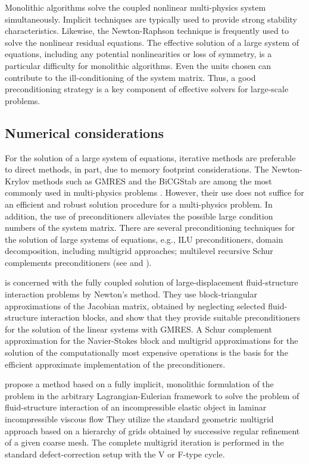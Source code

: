 Monolithic algorithms solve the coupled nonlinear multi-physics system simultaneously.
Implicit techniques are typically used to provide strong stability characteristics.
Likewise, the Newton-Raphson technique is frequently used to solve the nonlinear residual equations.
The effective solution of a large system of equations, including any potential nonlinearities or loss of symmetry, is a particular difficulty for monolithic algorithms.
Even the units chosen can contribute to the ill-conditioning of the system matrix.
Thus, a good preconditioning strategy is a key component of effective solvers for large-scale problems.

\subsection{Numerical considerations}

For the solution of a large system of equations, iterative methods are preferable to direct methods, in part, due to memory footprint considerations.
The Newton-Krylov methods such as GMRES and the BiCGStab are among the most commonly used in multi-physics problems \citep{hron_monolithic_2006}.
However, their use does not suffice for an efficient and robust solution procedure for a multi-physics problem.
In addition, the use of preconditioners alleviates the possible large condition numbers of the system matrix.
There are several preconditioning techniques for the solution of large systems of equations, e.g., ILU preconditioners, domain decomposition, including multigrid approaches; multilevel recursive Schur complements preconditioners (see \cite{smith_domain_2004} and \cite{chen_matrix_2005}).

\cite{heil_efficient_2004} is concerned with the fully coupled solution of large-displacement fluid-structure interaction problems by Newton's method.
They use block-triangular approximations of the Jacobian matrix, obtained by neglecting selected fluid-structure interaction blocks, and show that they provide suitable preconditioners for the solution of the linear systems with GMRES.
A Schur complement approximation for the Navier-Stokes block and multigrid approximations for the solution of the computationally most expensive operations is the basis for the efficient approximate implementation of the preconditioners.

\cite{hron_monolithic_2006} propose a method based on a fully implicit, monolithic formulation of the problem in the arbitrary Lagrangian-Eulerian framework  to solve the problem of fluid-structure interaction of an incompressible elastic object in laminar incompressible viscous flow
They utilize the standard geometric multigrid approach based on a hierarchy of grids obtained by successive regular refinement of a given coarse mesh.
The complete multigrid iteration is performed in the standard defect-correction setup with the V or F-type cycle.

